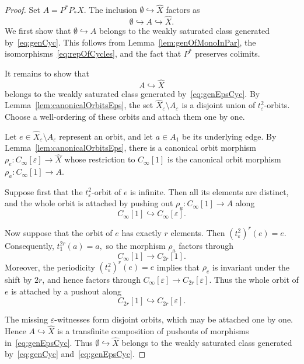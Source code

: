 \documentclass{article}
\theoremstyle{plain}
\theoremstyle{definition}
\theoremstyle{remark}
\begin{document}
\begin{proof}
Set \(A=P^*P_*X\). The inclusion
\(\emptyset\hookrightarrow\widehat X\) factors as
\[
    \emptyset\hookrightarrow A\hookrightarrow\widehat X.
\]
We first show that
\(\emptyset\hookrightarrow A\) belongs to the weakly saturated class
generated by~\eqref{eq:genCyc}.
This follows from Lemma~\ref{lem:genOfMonoInPar},
the isomorphisms~\eqref{eq:repOfCycles}, and the fact that
\(P^*\) preserves colimits.

It remains to show that
\[
    A\hookrightarrow\widehat X
\]
belongs to the weakly saturated class generated by~\eqref{eq:genEpsCyc}.
By Lemma~\ref{lem:canonicalOrbitsEps},
the set
\(
    \widehat X_\varepsilon\setminus A_\varepsilon
\)
is a disjoint union of \(t_\varepsilon^2\)-orbits.
Choose a well-ordering of these orbits and attach them one by one.

Let
\(
    e\in\widehat X_\varepsilon\setminus A_\varepsilon
\)
represent an orbit, and let \(a\in A_1\) be its underlying edge.
By Lemma~\ref{lem:canonicalOrbitsEps}, there is a canonical orbit morphism
\(
    \rho_e\colon C_\infty[\varepsilon]\rightarrow\widehat X
\)
whose restriction to \(C_\infty[1]\) is the canonical orbit morphism
\(
    \rho_a\colon C_\infty[1]\rightarrow A.
\)

Suppose first that the \(t_\varepsilon^2\)-orbit of \(e\) is infinite.
Then all its elements are distinct, and the whole orbit is attached
by pushing out
\(
    \rho_a\colon C_\infty[1]\rightarrow A
\)
along
\[
    C_\infty[1]\hookrightarrow C_\infty[\varepsilon].
\]

Now suppose that the orbit of \(e\) has exactly \(r\) elements. Then
\(
    (t_\varepsilon^2)^r(e)=e.
\)
Consequently,
\(
    t_1^{2r}(a)=a,
\)
so the morphism \(\rho_a\) factors through
\[
    C_\infty[1]\longrightarrow C_{2r}[1].
\]
Moreover, the periodicity
\((t_\varepsilon^2)^r(e)=e\) implies that \(\rho_e\) is invariant
under the shift by \(2r\), and hence factors through
\(
    C_\infty[\varepsilon]\longrightarrow C_{2r}[\varepsilon].
\)
Thus the whole orbit of \(e\) is attached by a pushout along
\[
    C_{2r}[1]\hookrightarrow C_{2r}[\varepsilon].
\]

The missing \(\varepsilon\)-witnesses form disjoint orbits, which may be attached one by one.
Hence \(A\hookrightarrow\widehat X\) is a transfinite composition of pushouts of morphisms in~\eqref{eq:genEpsCyc}.
Thus \(\emptyset\hookrightarrow\widehat X\) belongs to the weakly
saturated class generated by~\eqref{eq:genCyc} and~\eqref{eq:genEpsCyc}.
\end{proof}
\end{document}
